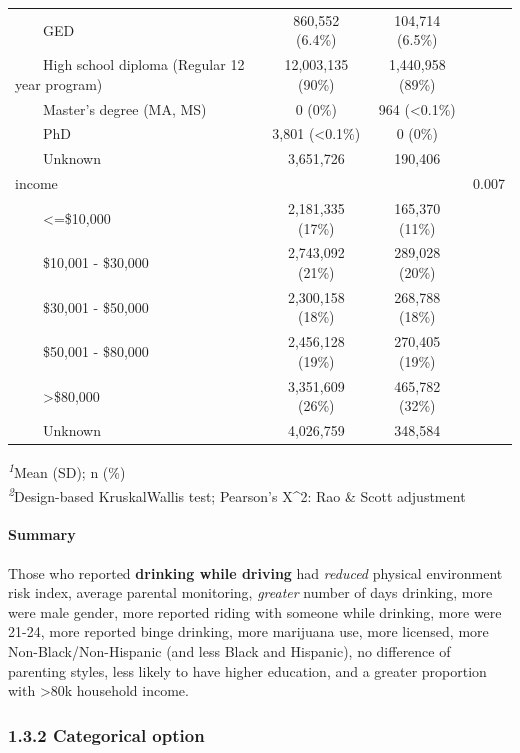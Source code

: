 \documentclass[
]{article}
\begin{document}
\begin{table}[t]
\begin{tabular*}{\linewidth}{@{\extracolsep{\fill}}lccc}
    GED & 860,552 (6.4\%) & 104,714 (6.5\%) &  \\ 
    High school diploma (Regular 12 year program) & 12,003,135 (90\%) & 1,440,958 (89\%) &  \\ 
    Master's degree (MA, MS) & 0 (0\%) & 964 (<0.1\%) &  \\ 
    PhD & 3,801 (<0.1\%) & 0 (0\%) &  \\ 
    Unknown & 3,651,726 & 190,406 &  \\ 
income &  &  & 0.007 \\ 
    <=\$10,000 & 2,181,335 (17\%) & 165,370 (11\%) &  \\ 
    \$10,001 - \$30,000 & 2,743,092 (21\%) & 289,028 (20\%) &  \\ 
    \$30,001 - \$50,000 & 2,300,158 (18\%) & 268,788 (18\%) &  \\ 
    \$50,001 - \$80,000 & 2,456,128 (19\%) & 270,405 (19\%) &  \\ 
    >\$80,000 & 3,351,609 (26\%) & 465,782 (32\%) &  \\ 
    Unknown & 4,026,759 & 348,584 &  \\ 
\bottomrule
\end{tabular*}
\begin{minipage}{\linewidth}
\textsuperscript{\textit{1}}Mean (SD); n (\%)\\
\textsuperscript{\textit{2}}Design-based KruskalWallis test; Pearson's X\^{}2: Rao \& Scott adjustment\\
\end{minipage}
\end{table}

\paragraph{Summary}\label{summary-1}

Those who reported \textbf{drinking while driving} had \emph{reduced}
physical environment risk index, average parental monitoring,
\emph{greater} number of days drinking, more were male gender, more
reported riding with someone while drinking, more were 21-24, more
reported binge drinking, more marijuana use, more licensed, more
Non-Black/Non-Hispanic (and less Black and Hispanic), no difference of
parenting styles, less likely to have higher education, and a greater
proportion with \textgreater80k household income.

\subsubsection{1.3.2 Categorical option}\label{categorical-option-1}
\end{document}
